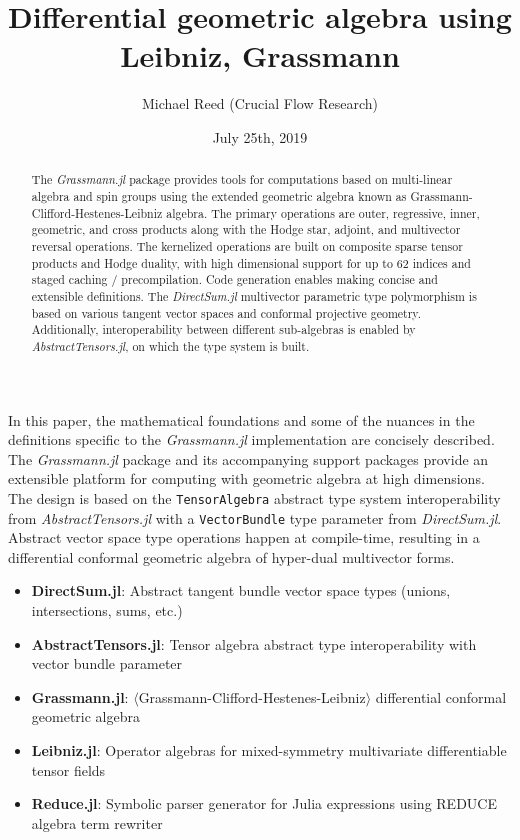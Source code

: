 \documentclass{juliacon}
\author{Michael Reed (Crucial Flow Research)}
\title{Differential geometric algebra using Leibniz, Grassmann}
\date{July 25th, 2019}
\begin{document}
%

\maketitle

\begin{abstract}
	The \textit{Grassmann.jl}
	package provides tools for computations based on multi-linear algebra and spin groups using the extended geometric algebra known as Grassmann-Clifford-Hestenes-Leibniz algebra.
	The primary operations are
	outer, regressive, inner, geometric, and cross products along with the Hodge star, adjoint, and multivector reversal operations. 
	The kernelized operations are built on composite sparse tensor products and Hodge duality, with high dimensional support for up to 62 indices and staged caching / precompilation. Code generation enables making concise and extensible definitions.
	The \textit{DirectSum.jl}
	multivector parametric type polymorphism is based on various tangent vector spaces and conformal projective geometry.
	Additionally, interoperability between different sub-algebras is enabled by \textit{AbstractTensors.jl},
	on which the type system is built.
\end{abstract}

In this paper, the mathematical foundations and some of the nuances in the definitions specific to the \textit{Grassmann.jl} implementation are concisely described.
The \textit{Grassmann.jl} package and its accompanying support packages provide an extensible platform for computing with geometric algebra at high dimensions. 
The design is based on the \verb`TensorAlgebra` abstract type system interoperability from \textit{AbstractTensors.jl} with a \verb`VectorBundle` type parameter from \textit{DirectSum.jl}. Abstract vector space type operations happen at compile-time, resulting in a differential conformal geometric algebra of hyper-dual multivector forms.

\begin{itemize}
	\item \textbf{DirectSum.jl}: Abstract tangent bundle vector space types (unions, intersections, sums, etc.)
	\item \textbf{AbstractTensors.jl}: Tensor algebra abstract type interoperability with vector bundle parameter	
	\item \textbf{Grassmann.jl}: $\langle$Grassmann-Clifford-Hestenes-Leibniz$\rangle$ differential conformal geometric algebra
	\item \textbf{Leibniz.jl}: Operator algebras for mixed-symmetry multivariate differentiable tensor fields
	\item \textbf{Reduce.jl}: Symbolic parser generator for Julia expressions using REDUCE algebra term rewriter
\end{itemize}
\end{document}

